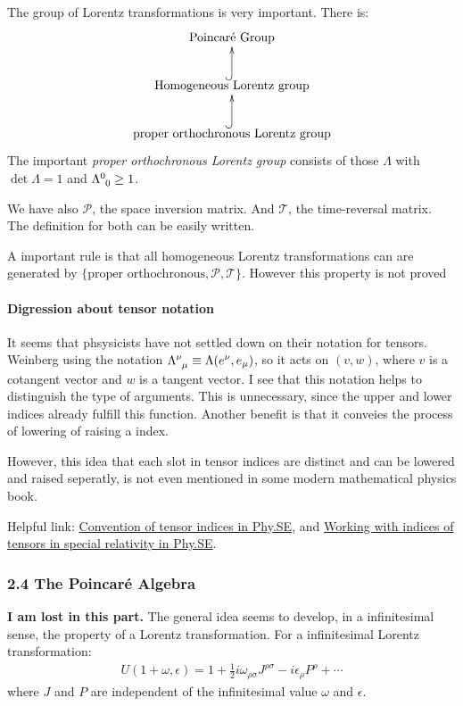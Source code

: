 \documentclass{article}
\numberwithin{equation}{subsection} %
\theoremstyle{definition}
\begin{document}
    The group of Lorentz transformations is very important. There is:
    \[
        \xymatrix{ 
        \text{Poincar\'e Group}  \\
        \text{Homogeneous Lorentz group} \ar@{^{(}->}[u] \\
        \text{proper orthochronous Lorentz group}\ar@{^{(}->}[u]
        }
    \]
    The important \textit{proper orthochronous Lorentz group} consists
    of those $\Lambda$ with $\det \Lambda = 1$ and 
    $\Lambda\indices{^0_0} \geq 1$.
    
    We have also $ \mathscr{P}$, the space inversion matrix. And
    \(\mathscr{T}\), the time-reversal matrix. The definition for
    both can be easily written.

    A important rule is that all homogeneous Lorentz transformations can
    are generated by 
    \(\{\text{proper orthochronous}, \mathscr{P}, \mathscr{T} \}\).
    However this property is not proved

    \paragraph{Digression about tensor notation} It seems that phsysicists
    have not settled down on their notation for tensors. Weinberg using
    the notation $\Lambda\indices{^\nu_\mu} \equiv \Lambda(e^\nu,e_\mu)$,
    so it acts on $(v,w)$, where $v$ is a cotangent vector and $w$ is a
    tangent vector. I see that this notation helps to distinguish the
    type of arguments. This is unnecessary, since the upper and lower
    indices already fulfill this function. Another benefit is that it
    conveies the process of lowering of raising a index. 
    
    However, this idea that each slot in tensor indices are distinct
    and can be lowered and raised seperatly, is not even mentioned
    in some modern mathematical physics book.

    Helpful link:
    \href{http://physics.stackexchange.com/questions/158309/convention-of-tensor-indices}{Convention of tensor indices in Phy.SE}, and 
    \href{http://physics.stackexchange.com/questions/237270/working-with-indices-of-tensors-in-special-relativity?noredirect=1&lq=1}{Working with indices of tensors in special relativity in Phy.SE}.

    \subsubsection{2.4 The Poincar\'{e} Algebra}
    \label{sec:2.4_The_Poincare_Algebra}
    \textbf{I am lost in this part.} The general idea seems to develop, in a 
    infinitesimal sense, the property of a Lorentz transformation.
    For a infinitesimal Lorentz transformation:
    \begin{align}
        U(1+\omega, \epsilon) = 
            1+ \frac{1}{2} i\omega_{\rho\sigma}J^{\rho\sigma}
            -i\epsilon_\rho P^\rho + \cdots
    \end{align}
    where $J$ and $P$ are independent of the infinitesimal value
    $\omega$ and $\epsilon$.
\end{document}
